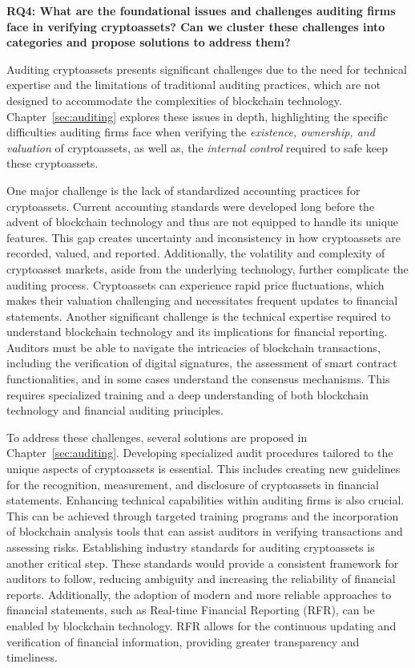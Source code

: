 \textbf{RQ4: What are the foundational issues and challenges auditing firms face in verifying cryptoassets? Can we cluster these challenges into categories and propose solutions to address them?}

Auditing cryptoassets presents significant challenges due to the need for technical expertise and the limitations of traditional auditing practices, which are not designed to accommodate the complexities of blockchain technology. Chapter~\ref{sec:auditing} explores these issues in depth, highlighting the specific difficulties auditing firms face when verifying the \textit{existence, ownership, and valuation} of cryptoassets, as well as, the \textit{internal control} required to safe keep these cryptoassets.

One major challenge is the lack of standardized accounting practices for cryptoassets. Current accounting standards were developed long before the advent of blockchain technology and thus are not equipped to handle its unique features. This gap creates uncertainty and inconsistency in how cryptoassets are recorded, valued, and reported. Additionally, the volatility and complexity of cryptoasset markets, aside from the underlying technology, further complicate the auditing process. Cryptoassets can experience rapid price fluctuations, which makes their valuation challenging and necessitates frequent updates to financial statements. Another significant challenge is the technical expertise required to understand blockchain technology and its implications for financial reporting. Auditors must be able to navigate the intricacies of blockchain transactions, including the verification of digital signatures, the assessment of smart contract functionalities, and in some cases understand the consensus mechanisms. This requires specialized training and a deep understanding of both blockchain technology and financial auditing principles.

To address these challenges, several solutions are proposed in Chapter~\ref{sec:auditing}. Developing specialized audit procedures tailored to the unique aspects of cryptoassets is essential. This includes creating new guidelines for the recognition, measurement, and disclosure of cryptoassets in financial statements. Enhancing technical capabilities within auditing firms is also crucial. This can be achieved through targeted training programs and the incorporation of blockchain analysis tools that can assist auditors in verifying transactions and assessing risks. Establishing industry standards for auditing cryptoassets is another critical step. These standards would provide a consistent framework for auditors to follow, reducing ambiguity and increasing the reliability of financial reports. Additionally, the adoption of modern and more reliable approaches to financial statements, such as Real-time Financial Reporting (RFR), can be enabled by blockchain technology. RFR allows for the continuous updating and verification of financial information, providing greater transparency and timeliness.

